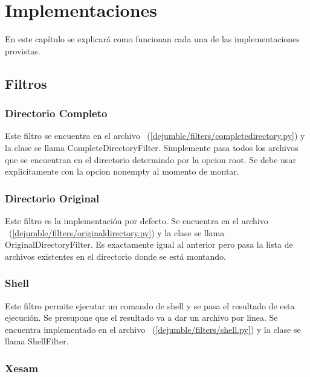 \chapter{Implementaciones}
\ifpdf
    \graphicspath{{Chapter2/Chapter2Figs/PNG/}{Chapter2/Chapter2Figs/PDF/}{Chapter2/Chapter2Figs/}}
\else
    \graphicspath{{Chapter2/Chapter2Figs/EPS/}{Chapter2/Chapter2Figs/}}
\fi

En este capítulo se explicará como funcionan cada una de las implementaciones provistas.


\section{Filtros}

\subsection{Directorio Completo}

Este filtro se encuentra en el archivo ~(\ref{dejumble/filters/completedirectory.py}) y la clase se llama CompleteDirectoryFilter. Simplemente pasa todos los archivos que se encuentran en el directorio determindo por la opcion root. Se debe usar explicitamente con la opcion nonempty al momento de montar.

\subsection{Directorio Original}

Este filtro es la implementación por defecto. Se encuentra en el archivo ~(\ref{dejumble/filters/originaldirectory.py}) y la clase se llama OriginalDirectoryFilter. Es exactamente igual al anterior pero pasa la lista de archivos existentes en el directorio donde se está montando.

\subsection{Shell}

Este filtro permite ejecutar un comando de shell y se pasa el resultado de esta ejecución. Se presupone que el resultado va a dar un archivo por linea. Se encuentra implementado en el archivo ~(\ref{dejumble/filters/shell.py}) y la clase se llama ShellFilter.

\subsection{Xesam}


